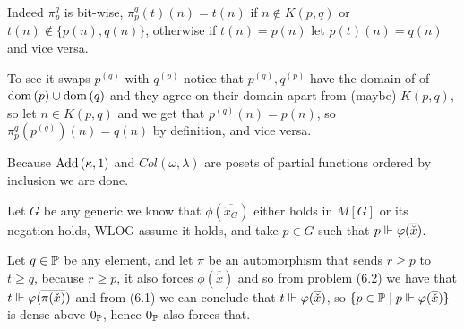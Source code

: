 Indeed $\pi_p^q$ is bit-wise, $\pi_p^q(t)(n)=t(n)$ if $n\notin K(p,q)$ or $t(n)\notin\{p(n),q(n)\}$, otherwise if $t(n)=p(n)$ let $p(t)(n)=q(n)$ and vice versa.

To see it swaps $p^{(q)}$ with $q^{(p)}$ notice that $p^{(q)},q^{(p)}$ have the domain of of $\dom{p}\cup\dom{q}$ and they agree on their domain apart from (maybe) $K(p,q)$, so let $n\in K(p,q)$ and we get that $p^{(q)}(n)=p(n)$, so $\pi_p^q(p^{(q)})(n)=q(n)$ by definition, and vice versa.

Because $\Add{\kappa}{1}$ and $Col(\omega,\lambda)$ are posets of partial functions ordered by inclusion we are done.

\sub{}
Let $G$ be any generic we know that $\phi(\overline{\check{x}_G})$ either holds in $M[G]$ or its negation holds, WLOG assume it holds, and take $p\in G$ such that $p\force \phi(\overline{\check{x}})$.

Let $q\in\P$ be any element, and let $\pi$ be an automorphism that sends $r\ge p$ to $t\ge q$, because $r\ge p$, it also forces $\phi(\overline{\check{x}})$ and so from problem (6.2) we have that $t\force \phi(\overline{\pi(\check{x})})$ and from (6.1) we can conclude that $t\force \phi(\overline{\check{x}})$, so $\{p\in \P\mid p\force\phi(\overline{\check{x}})\}$ is dense above $0_\P$, hence $0_\P$ also forces that.








